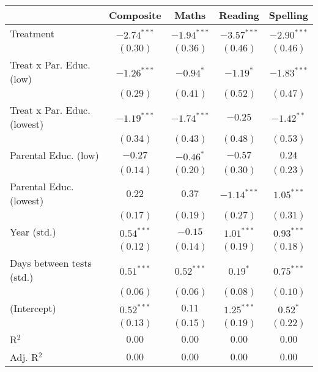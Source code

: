 
\begin{table}
\begin{center}
\begin{tabular}{l c c c c}
\hline
 & Composite & Maths & Reading & Spelling \\
\hline
Treatment                   & $-2.74^{***}$ & $-1.94^{***}$ & $-3.57^{***}$ & $-2.90^{***}$ \\
                            & $(0.30)$      & $(0.36)$      & $(0.46)$      & $(0.46)$      \\
Treat x Par. Educ. (low)    & $-1.26^{***}$ & $-0.94^{*}$   & $-1.19^{*}$   & $-1.83^{***}$ \\
                            & $(0.29)$      & $(0.41)$      & $(0.52)$      & $(0.47)$      \\
Treat x Par. Educ. (lowest) & $-1.19^{***}$ & $-1.74^{***}$ & $-0.25$       & $-1.42^{**}$  \\
                            & $(0.34)$      & $(0.43)$      & $(0.48)$      & $(0.53)$      \\
Parental Educ. (low)        & $-0.27$       & $-0.46^{*}$   & $-0.57$       & $0.24$        \\
                            & $(0.14)$      & $(0.20)$      & $(0.30)$      & $(0.23)$      \\
Parental Educ. (lowest)     & $0.22$        & $0.37$        & $-1.14^{***}$ & $1.05^{***}$  \\
                            & $(0.17)$      & $(0.19)$      & $(0.27)$      & $(0.31)$      \\
Year (std.)                 & $0.54^{***}$  & $-0.15$       & $1.01^{***}$  & $0.93^{***}$  \\
                            & $(0.12)$      & $(0.14)$      & $(0.19)$      & $(0.18)$      \\
Days between tests (std.)   & $0.51^{***}$  & $0.52^{***}$  & $0.19^{*}$    & $0.75^{***}$  \\
                            & $(0.06)$      & $(0.06)$      & $(0.08)$      & $(0.10)$      \\
(Intercept)                 & $0.52^{***}$  & $0.11$        & $1.25^{***}$  & $0.52^{*}$    \\
                            & $(0.13)$      & $(0.15)$      & $(0.19)$      & $(0.22)$      \\
\hline
R$^2$                       & $0.00$        & $0.00$        & $0.00$        & $0.00$        \\
Adj. R$^2$                  & $0.00$        & $0.00$        & $0.00$        & $0.00$        \\

\end{tabular}
\end{center}
\end{table}
